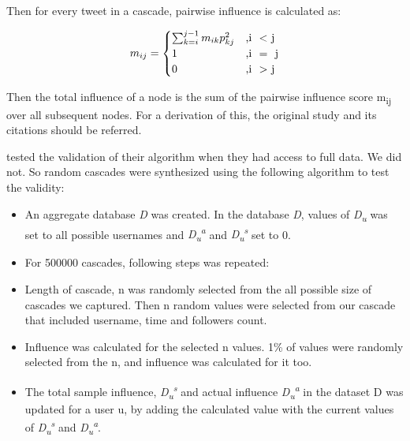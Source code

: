 \documentclass[letterpaper]{article}
\begin{document}
Then for every tweet in a cascade, pairwise influence is calculated as:

\begin{equation}
    m_{ij} =
      \begin{cases}
        \sum_{k=i}^{j-1}m_{ik}p_{kj}^2 & \text{,i \ \textless \ j}\\
        1 & \text{,i \ = \ j}\\
        0 & \text{,i \ \textgreater \ j}
      \end{cases}       
    \end{equation}

Then the total influence of a node is the sum of the pairwise influence score m\textsubscript{ij} over all subsequent nodes. For a derivation of this, the original study
 \cite{rizoiu2018debatenight} and its citations should be referred. \par

 \cite{rizoiu2018debatenight} tested the validation of their algorithm when they had access to full data. We did not. So random cascades were synthesized using the following algorithm 
 to test the validity:
 
 \begin{itemize}
    \item An aggregate database \textit{D} was created. In the database \textit{D}, values of \textit{D\textsubscript{u}} was set to all possible usernames  and \textit{D\textsubscript{u}\textsuperscript{a}}
     and \textit{D\textsubscript{u}\textsuperscript{s}} set to 0.
    \item For 500000 cascades, following steps was repeated:
    \setlength{\itemindent}{+.3in}
    \item Length of cascade, n was randomly selected from the all possible size of cascades we captured. Then n random values were selected from our cascade that included 
    username, time and followers count.
    \item Influence was calculated for the selected n values. 1\% of values were randomly selected from the n, and influence was calculated for it too.
    \item The total sample influence, \textit{D\textsubscript{u}\textsuperscript{s}} and actual influence \textit{D\textsubscript{u}\textsuperscript{a}} in the dataset D was updated for a user u,
    by adding the calculated value with the current values of \textit{D\textsubscript{u}\textsuperscript{s}} and \textit{D\textsubscript{u}\textsuperscript{a}}.
 \end{itemize}
\end{document}
